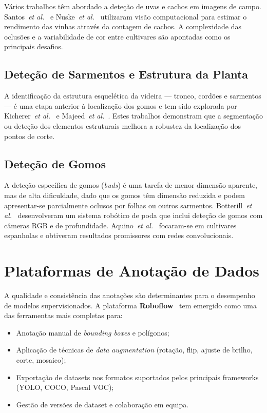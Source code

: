 Vários trabalhos têm abordado a deteção de uvas e cachos em imagens de
campo. Santos~\textit{et al.}~\cite{santos2020grape} e Nuske~\textit{et
al.}~\cite{nuske2011estimating} utilizaram visão computacional para estimar
o rendimento das vinhas através da contagem de cachos. A complexidade das
oclusões e a variabilidade de cor entre cultivares são apontadas como os
principais desafios.

\subsection{Deteção de Sarmentos e Estrutura da Planta}

A identificação da estrutura esquelética da videira — tronco, cordões e
sarmentos — é uma etapa anterior à localização dos gomos e tem sido explorada
por Kicherer~\textit{et al.}~\cite{kicherer2015automatic} e Majeed~\textit{et
al.}~\cite{majeed2020deep}. Estes trabalhos demonstram que a segmentação ou
deteção dos elementos estruturais melhora a robustez da localização dos
pontos de corte.

\subsection{Deteção de Gomos}

A deteção específica de gomos (\textit{buds}) é uma tarefa de menor dimensão
aparente, mas de alta dificuldade, dado que os gomos têm dimensão reduzida
e podem apresentar-se parcialmente oclusos por folhas ou outros sarmentos.
Botterill~\textit{et al.}~\cite{botterill2017robot} desenvolveram um sistema
robótico de poda que inclui deteção de gomos com câmeras RGB e de
profundidade. Aquino~\textit{et al.}~\cite{aquino2018vitisberry} focaram-se
em cultivares espanholas e obtiveram resultados promissores com redes
convolucionais.

\section{Plataformas de Anotação de Dados}

A qualidade e consistência das anotações são determinantes para o desempenho
de modelos supervisionados. A plataforma \textbf{Roboflow}~\cite{roboflow2020}
tem emergido como uma das ferramentas mais completas para:

\begin{itemize}
  \item Anotação manual de \textit{bounding boxes} e polígonos;
  \item Aplicação de técnicas de \textit{data augmentation} (rotação, flip,
    ajuste de brilho, corte, mosaico);
  \item Exportação de datasets nos formatos suportados pelos principais
    frameworks (YOLO, COCO, Pascal VOC);
  \item Gestão de versões de dataset e colaboração em equipa.
\end{itemize}

